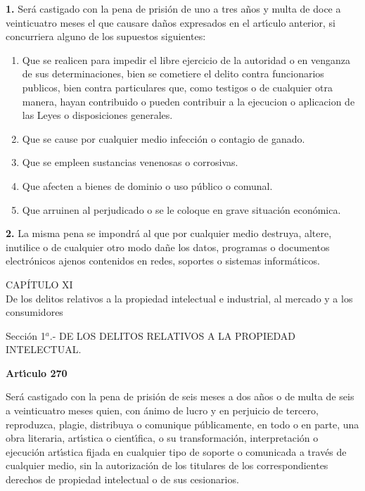 {\bf 1.} Ser\'a castigado con la pena de prisi\'on de uno a tres a\~nos y multa 
de doce a veinticuatro meses el que causare da\~nos expresados en el 
art\'{\i}culo anterior, si concurriera alguno de los supuestos siguientes: 
\begin{enumerate} 
\item Que se realicen para impedir el libre ejercicio de la autoridad 
o en venganza de sus determinaciones, bien se cometiere el delito contra 
funcionarios publicos, bien contra particulares que, como testigos o de 
cualquier otra manera, hayan contribuido o pueden contribuir a la ejecucion 
o aplicacion de las Leyes o disposiciones generales. 
\item Que se cause por cualquier medio infecci\'on o contagio de ganado. 
\item Que se empleen sustancias venenosas o corrosivas. 
\item Que afecten a bienes de dominio o uso p\'ublico o comunal. 
\item Que arruinen al perjudicado o se le coloque en grave situaci\'on 
econ\'omica. 
\end{enumerate} 

{\bf 2.} La misma pena se impondr\'a al que por cualquier medio destruya, 
altere, inutilice o de cualquier otro modo da\~ne los datos, programas o 
documentos electr\'onicos ajenos contenidos en redes, soportes o sistemas 
inform\'aticos. 
 
\begin{center} 
{\Large CAP\'ITULO XI}\\
De los delitos relativos a la propiedad intelectual e industrial, al mercado y 
a los consumidores 
\end{center} 
 
\begin{center} 
	Secci\'on 1$^{a}$.- DE LOS DELITOS RELATIVOS A LA PROPIEDAD 
INTELECTUAL. 
\end{center} 
{\large {\bf Art\'{\i}culo 270}}
 
Ser\'a castigado con la pena de prisi\'on de seis meses a dos a\~nos o de 
multa de seis a veinticuatro meses quien, con \'animo de lucro y en perjuicio 
de tercero, reproduzca, plagie, distribuya o comunique p\'ublicamente, en todo 
o en parte, una obra literaria, art\'{\i}stica o cient\'{\i}fica, o su 
transformaci\'on, interpretaci\'on o ejecuci\'on art\'{\i}stica fijada en 
cualquier tipo de soporte o comunicada a trav\'es de cualquier medio, sin la 
autorizaci\'on de los titulares de los correspondientes derechos de propiedad 
intelectual o de sus cesionarios.\\ 

